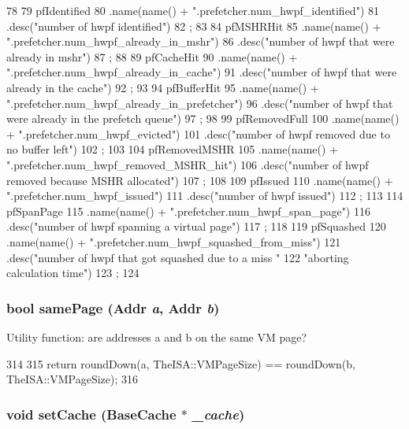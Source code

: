 \begin{DoxyCode}
78 {
79     pfIdentified
80         .name(name() + ".prefetcher.num_hwpf_identified")
81         .desc("number of hwpf identified")
82         ;
83 
84     pfMSHRHit
85         .name(name() + ".prefetcher.num_hwpf_already_in_mshr")
86         .desc("number of hwpf that were already in mshr")
87         ;
88 
89     pfCacheHit
90         .name(name() + ".prefetcher.num_hwpf_already_in_cache")
91         .desc("number of hwpf that were already in the cache")
92         ;
93 
94     pfBufferHit
95         .name(name() + ".prefetcher.num_hwpf_already_in_prefetcher")
96         .desc("number of hwpf that were already in the prefetch queue")
97         ;
98 
99     pfRemovedFull
100         .name(name() + ".prefetcher.num_hwpf_evicted")
101         .desc("number of hwpf removed due to no buffer left")
102         ;
103 
104     pfRemovedMSHR
105         .name(name() + ".prefetcher.num_hwpf_removed_MSHR_hit")
106         .desc("number of hwpf removed because MSHR allocated")
107         ;
108 
109     pfIssued
110         .name(name() + ".prefetcher.num_hwpf_issued")
111         .desc("number of hwpf issued")
112         ;
113 
114     pfSpanPage
115         .name(name() + ".prefetcher.num_hwpf_span_page")
116         .desc("number of hwpf spanning a virtual page")
117         ;
118 
119     pfSquashed
120         .name(name() + ".prefetcher.num_hwpf_squashed_from_miss")
121         .desc("number of hwpf that got squashed due to a miss "
122               "aborting calculation time")
123         ;
124 }
\end{DoxyCode}
\hypertarget{classBasePrefetcher_a0092f15516ff429fb7437fd21747fbf5}{
\subsubsection[{samePage}]{\setlength{\rightskip}{0pt plus 5cm}bool samePage ({\bf Addr} {\em a}, \/  {\bf Addr} {\em b})}}
\label{classBasePrefetcher_a0092f15516ff429fb7437fd21747fbf5}
Utility function: are addresses a and b on the same VM page? 


\begin{DoxyCode}
314 {
315     return roundDown(a, TheISA::VMPageSize) == roundDown(b, TheISA::VMPageSize);
316 }
\end{DoxyCode}
\hypertarget{classBasePrefetcher_a6a5d34a51c5ba1c4f87dbcc59e8b13fb}{
\subsubsection[{setCache}]{\setlength{\rightskip}{0pt plus 5cm}void setCache ({\bf BaseCache} $\ast$ {\em \_\-cache})}}
\label{classBasePrefetcher_a6a5d34a51c5ba1c4f87dbcc59e8b13fb}



